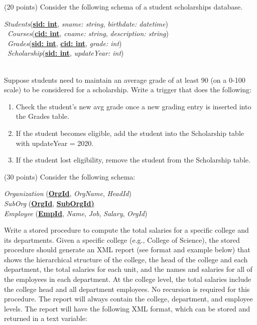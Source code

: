 \begin{questions}
\begin{choices}
\end{choices}


\question (20 points) Consider the following schema of a student scholarships database.\\
\begin{addmargin}[1em]{2em}%

    \textit{Students}(\textbf{\underline{sid: int}},  \textit{sname: string}, \textit{birthdate: datetime})\\\
    \textit{Courses}(\textbf{\underline{cid: int}},  \textit{cname: string}, \textit{description: string})\\\
    \textit{Grades}(\textbf{\underline{sid: int}}, \textbf{\underline{cid: int}}, \textit{grade: int})\\\
    \textit{Scholarship}(\textbf{\underline{sid: int}}, \textit{updateYear: int})\\\
    
\end{addmargin}
Suppose students need to maintain an average grade of at least 90 (on a 0-100 scale) to be considered for a scholarship. Write a trigger that does the following: \\
\begin{enumerate}
    \item Check the student's new avg grade once a new grading entry is inserted into the Grades table.
    \item If the student becomes eligible, add the student into the Scholarship table with updateYear = 2020. 
    \item If the student lost eligibility, remove the student from the Scholarship table. 
\end{enumerate}


\question (30 points) Consider the following schema:
\begin{addmargin}[1em]{2em}%
    \textit{Organization} (\textbf{\underline{OrgId}},  \textit{OrgName}, \textit{HeadId})\\
    \textit{SubOrg} (\textbf{\underline{OrgId}}, \textbf{\underline{SubOrgId)}}\\
    \textit{Employee} (\textbf{\underline{EmpId}}, \textit{Name}, \textit{Job}, \textit{Salary}, \textit{OrgId})
\end{addmargin}

Write a stored procedure to compute the total salaries for a specific college and its departments. Given a specific college (e.g., College of Science), the stored procedure should generate an XML report (see format and example below) that shows the hierarchical structure of the college, the head of the college and each department, the total salaries for each unit, and the names and salaries for all of the employees in each department. At the college level, the total salaries include the college head and all department employees. No recursion is required for this procedure. The report will always contain the college, department, and employee levels. The report will have the following XML format, which can be stored and returned in a text variable:


\end{questions}
